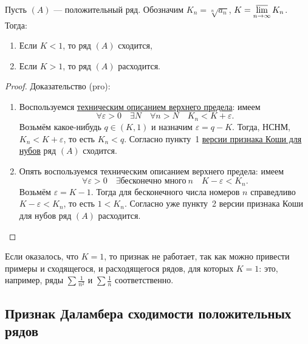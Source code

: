 \begin{theorem}
	Пусть \((A)\) --- положительный ряд. Обозначим \(K_n = \sqrt[n]{a_n}\), \(K = \varlimsup\limits_{n \to \infty} K_n\). Тогда:
	\begin{enumerate}
		\item Если \(K < 1\), то ряд \((A)\) сходится,
		\item Если \(K > 1\), то ряд \((A)\) расходится.
	\end{enumerate}
\end{theorem}
\begin{proof}
	Доказательство (pro):
	\begin{enumerate}
		\item Воспользуемся \hyperlink{техническое описание верхнего предела}{техническим описанием верхнего предела}: имеем \[
		\forall \varepsilon > 0 \quad \exists N \quad \forall n > N \quad K_n < K + \varepsilon.
		\]
		Возьмём какое-нибудь \(q \in (K, 1)\) и назначим \(\varepsilon = q - K\). Тогда, НСНМ, \(K_n < K + \varepsilon\), то есть \(K_n < q\). Согласно пункту~1 \hyperlink{Коши-нуб}{версии признака Коши для нубов} ряд \((A)\) сходится.
		\item Опять воспользуемся техническим описанием верхнего предела: имеем \[
		\forall \varepsilon > 0 \quad \exists \textit{бесконечно много} \ n \quad K - \varepsilon < K_n.
		\]
		Возьмём \(\varepsilon = K - 1\). Тогда для бесконечного числа номеров \(n\) справедливо \(K - \varepsilon < K_n\), то есть \(1 < K_n\). Согласно уже пункту~2 версии признака Коши для нубов ряд \((A)\) расходится.
	\end{enumerate}
\end{proof}

\begin{remark}
	Если оказалось, что \(K = 1\), то признак не работает, так как можно привести примеры и сходящегося, и расходящегося рядов, для которых \(K = 1\): это, например, ряды \(\sum \frac{1}{n^2}\) и \(\sum \frac{1}{n}\) соответственно.
\end{remark}

\subsection{Признак Даламбера сходимости положительных рядов}

